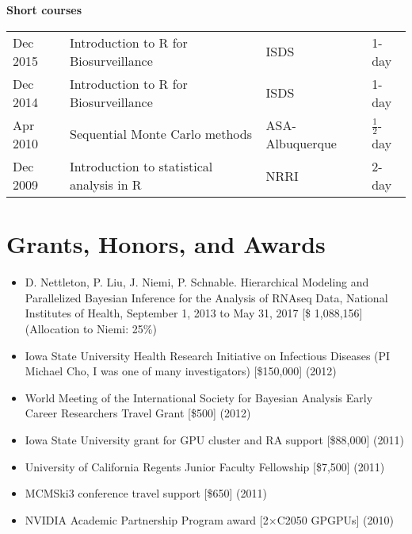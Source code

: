 \documentclass[overlapped,line]{res}
\begin{document}
\begin{resume}
%



{\bf Short courses}

\begin{tabular}{llll}
Dec 2015 & Introduction to R for Biosurveillance & ISDS & 1-day \\
Dec 2014 & Introduction to R for Biosurveillance & ISDS & 1-day \\
Apr 2010 & Sequential Monte Carlo methods & ASA-Albuquerque & $\frac{1}{2}$-day \\
Dec 2009 & Introduction to statistical analysis in R & NRRI & 2-day
\end{tabular}




\section{\bf Grants, Honors, and Awards}

\begin{itemize}
\item D. Nettleton, P. Liu, J. Niemi, P. Schnable. Hierarchical Modeling and Parallelized Bayesian Inference for the Analysis of RNAseq Data, National Institutes of Health, September 1, 2013 to May 31, 2017 [\$ 1,088,156] (Allocation to Niemi: 25\%)

\item Iowa State University Health Research Initiative on Infectious Diseases (PI Michael Cho, I was one of many investigators) [\$150,000] (2012)
\item World Meeting of the International Society for Bayesian Analysis Early Career Researchers Travel Grant [\$500] (2012)
\item Iowa State University grant for GPU cluster and RA support [\$88,000] (2011)
\item University of California Regents Junior Faculty Fellowship [\$7,500] (2011)
\item MCMSki3 conference travel support [\$650] (2011)
\item NVIDIA Academic Partnership Program award [2$\times$C2050 GPGPUs] (2010)




\end{itemize}
\end{resume}
\end{document}
